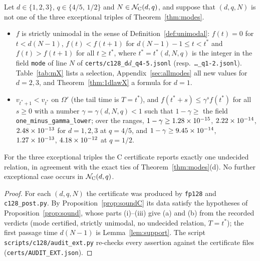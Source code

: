 \begin{theorem}\label{thm:modesX}
Let $d\in\{1,2,3\}$, $q\in\{4/5,\,1/2\}$ and $N\in\mathcal N_{\rm C}(d,q)$, and suppose that $(d,q,N)$ is not one of the three exceptional triples of Theorem~\ref{thm:modes}.
\begin{itemize}
\item[(a)] $f$ is strictly unimodal in the sense of Definition~\ref{def:unimodal}: $f(t)=0$ for $t<d(N-1)$, $f(t)<f(t+1)$ for $d(N-1)-1\le t<t^*$ and $f(t)>f(t+1)$ for all $t\ge t^*$, where $t^*=t^*(d,N,q)$ is the integer in the field \texttt{mode} of line $N$ of \texttt{certs/c128\_d$d$\_q4-5.jsonl} (resp.\ \texttt{\dots\_q1-2.jsonl}). Table~\ref{tab:mX} lists a selection, Appendix~\ref{sec:allmodes} all new values for $d=2,3$, and Theorem~\ref{thm:1dlawX} a formula for $d=1$.
\item[(b)] $v_{t^*+1}<v_{t^*}$ on $\Omega'$ (the tail time is $T=t^*$), and $f(t^*+s)\le\gamma^sf(t^*)$ for all $s\ge0$ with a number $\gamma=\gamma(d,N,q)<1$ such that $1-\gamma\ge$ the field \texttt{one\_minus\_gamma\_lower}; over the ranges, $1-\gamma\ge1.28\times10^{-15}$, $2.22\times10^{-14}$, $2.48\times10^{-13}$ for $d=1,2,3$ at $q=4/5$, and $1-\gamma\ge9.45\times10^{-14}$, $1.27\times10^{-13}$, $4.18\times10^{-12}$ at $q=1/2$.
\end{itemize}
For the three exceptional triples the C certificate reports exactly one undecided relation, in agreement with the exact ties of Theorem~\ref{thm:modes}(d). No further exceptional case occurs in $\mathcal N_{\rm C}(d,q)$.
\end{theorem}
\begin{proof}
For each $(d,q,N)$ the certificate was produced by \texttt{fp128} and \texttt{c128\_post.py}. By Proposition~\ref{prop:soundC} its data satisfy the hypotheses of Proposition~\ref{prop:sound}, whose parts (i)--(iii) give (a) and (b) from the recorded verdicts (mode certified, strictly unimodal, no undecided relation, $T=t^*$); the first passage time $d(N-1)$ is Lemma~\ref{lem:support}. The script \texttt{scripts/c128/audit\_ext.py} re-checks every assertion against the certificate files (\texttt{certs/AUDIT\_EXT.json}).
\end{proof}

